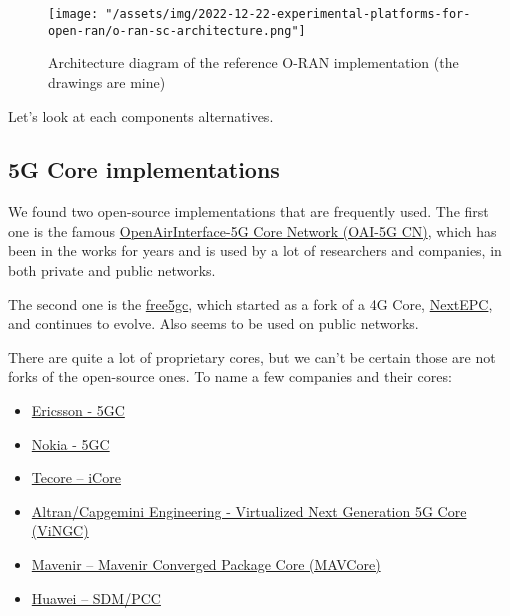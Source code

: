 \documentclass{article}
\begin{document}
    \begin{figure}
        \texttt{[image: "/assets/img/2022-12-22-experimental-platforms-for-open-ran/o-ran-sc-architecture.png"]}
        \caption{Architecture diagram of the reference O-RAN implementation (the drawings are mine)}
        \label{fig:o-ran-sc-architecture}
    \end{figure}

    Let's look at each components alternatives.

    \subsection{5G Core implementations}

        We found two open-source implementations that are frequently used.
        The first one is the famous \href{https://openairinterface.org/oai-5g-core-network-project/}{OpenAirInterface-5G Core Network (OAI-5G CN)},
        which has been in the works for years and is used by a lot of researchers and companies,
        in both private and public networks.

        The second one is the \href{https://www.free5gc.org/}{free5gc}, which started as a fork
        of a 4G Core, \href{https://nextepc.org/}{NextEPC}, and continues to evolve. Also seems
        to be used on public networks.

        There are quite a lot of proprietary cores, but we can't be certain those are not
        forks of the open-source ones. To name a few companies and their cores:

        \begin{itemize}
            \item \href{https://www.ericsson.com/en/core-network/5g-core}{Ericsson - 5GC}
            \item \href{https://www.nokia.com/networks/core/5g-core/}{Nokia - 5GC}
            \item \href{https://www.tecore.com/core-network-products/}{Tecore – iCore}
            \item \href{https://capgemini-engineering.com/us/en/brochure/virtualized-next-generation-5g-core/}{Altran/Capgemini Engineering - Virtualized Next Generation 5G Core (ViNGC)}
            \item \href{https://www.mavenir.com/portfolio/mavcore/}{Mavenir – Mavenir Converged Package Core (MAVCore)}
            \item \href{https://carrier.huawei.com/en/products/core-network/sdm}{Huawei – SDM/PCC}
        \end{itemize}
\end{document}
